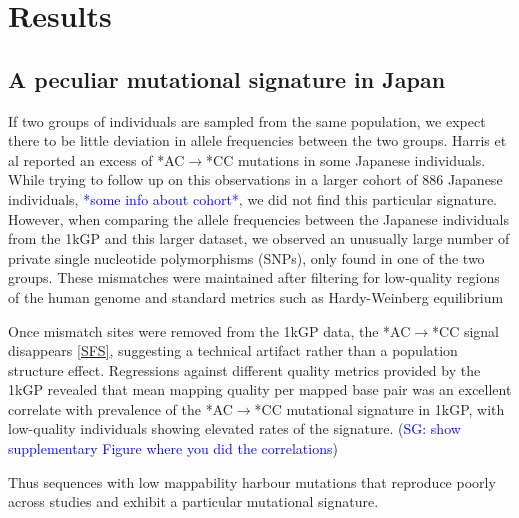 \documentclass[9pt,lineno]{elife}
\newcommand{\sgcomment}[1]{\textcolor{blue}{SG: #1}}
\newcommand{\todo}[1]{\textcolor{blue}{*#1*}}
\begin{document}

	

			\section{Results}
	\subsection{A peculiar mutational signature in Japan}			
If two groups of individuals are sampled from the same population, we expect there to be little deviation in allele frequencies between the two groups. 
Harris et al reported an excess of *AC${\rightarrow}$*CC mutations in some Japanese individuals. 
While trying to follow up on this observations in a larger cohort of 886 Japanese individuals, \todo{some info about cohort}, we did not find this particular signature.
However, when comparing the allele frequencies between the Japanese individuals from the 1kGP and this larger dataset, we observed an unusually large number of private single nucleotide polymorphisms (SNPs), only found in one of the two groups. These mismatches were maintained after filtering for low-quality regions of the human genome and standard metrics such as Hardy-Weinberg equilibrium

Once mismatch sites were removed from the 1kGP data, the  *AC${\rightarrow}$*CC signal disappears \ref{SFS}, suggesting a technical artifact rather than a population structure effect. Regressions against different quality metrics provided by the 1kGP revealed that mean mapping quality per mapped base pair was an excellent correlate with prevalence of the  *AC${\rightarrow}$*CC mutational signature in 1kGP, with low-quality individuals showing elevated rates of the signature. (\sgcomment{show supplementary Figure where you did the correlations})
 
 Thus sequences with low mappability harbour mutations that reproduce poorly across studies and exhibit a particular mutational signature. 
\end{document}

